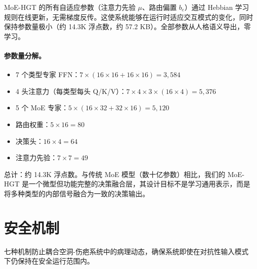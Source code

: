 \documentclass[11pt]{article}
\begin{document}
MoE-HGT 的所有自适应参数（注意力先验 $\mu$、路由偏置 $b_e$）通过 Hebbian 学习规则在线更新，无需梯度反传。这使系统能够在运行时适应交互模式的变化，同时保持参数量极小（约 14.3K 浮点数，约 57.2 KB）。全部参数从人格语义导出，零学习。

\paragraph{参数量分解。}
\begin{itemize}
\item 7 个类型专家 FFN：$7 \times (16 \times 16 + 16 \times 16) = 3{,}584$
\item 4 头注意力（每类型每头 Q/K/V）：$7 \times 4 \times 3 \times (16 \times 4) = 5{,}376$
\item 5 个 MoE 专家：$5 \times (16 \times 32 + 32 \times 16) = 5{,}120$
\item 路由权重：$5 \times 16 = 80$
\item 决策头：$16 \times 4 = 64$
\item 注意力先验：$7 \times 7 = 49$
\end{itemize}
总计：约 14.3K 浮点数。与传统 MoE 模型（数十亿参数）相比，我们的 MoE-HGT 是一个微型但功能完整的决策融合层，其设计目标不是学习通用表示，而是将多种类型的内部信号融合为一致的决策输出。

\section{安全机制}
\label{sec:safety}

七种机制防止耦合空洞-伤疤系统中的病理动态，确保系统即使在对抗性输入模式下仍保持在安全运行范围内。
\end{document}
